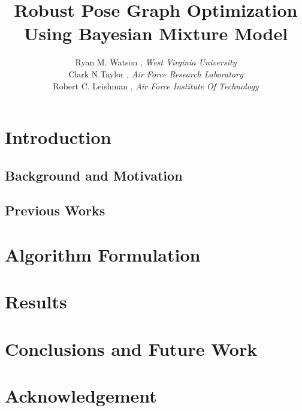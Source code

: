\documentclass[ugly]{ion}
\begin{document}
\title{Robust Pose Graph Optimization Using Bayesian Mixture Model \\ }
\author{Ryan M. Watson , { \it West Virginia University} \\   
		Clark N.Taylor , {\it Air Force Research Laboratory} \\ 
	    Robert C. Leishman , {\it Air Force Institute Of Technology} }
\maketitle


\begin{abstract}
 
\end{abstract}

\section{Introduction}
\subsection{Background and Motivation}


\subsection{Previous Works}

 
\section{Algorithm Formulation}


\section{Results}

 
\section{Conclusions and Future Work}



\section*{Acknowledgement}
\end{document}
